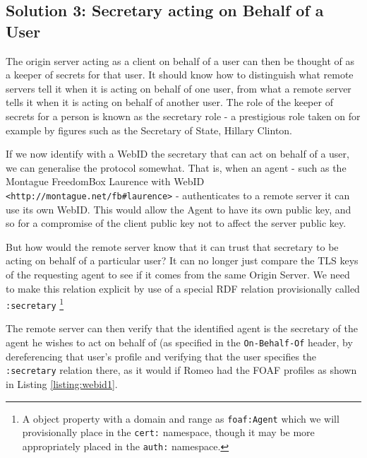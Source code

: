 \documentclass[a4paper]{llncs}
\begin{document}

\subsection{Solution 3: Secretary acting on Behalf of a User}

The origin server acting as a client on behalf of a user can then be thought of as a keeper of secrets for that user.
It should know how to distinguish what remote servers tell it when it is acting on behalf of one user, from what a remote server tells it when it is acting on behalf of another user.
The role of the keeper of secrets for a person is known as the secretary role - a prestigious role taken on for example by figures such as the Secretary of State, Hillary Clinton.

If we now identify with a WebID the secretary that can act on behalf of a user, we can generalise the protocol somewhat.
That is, when an agent - such as the Montague FreedomBox Laurence with WebID \lstinline|<http://montague.net/fb#laurence>| - authenticates to a remote server it can use its own WebID. 
This would allow the Agent to have its own public key, and so for a compromise of the client public key not to affect the server public key.

But how would the remote server know that it can trust that secretary to be acting on behalf of a particular user?
It can no longer just compare the TLS keys of the requesting agent to see if it comes from the same Origin Server.
We need to make this relation explicit by use of a special RDF relation provisionally called \lstinline|:secretary|%
\footnote{A object property with a domain and range as \lstinline|foaf:Agent| which we will provisionally place
in the \lstinline|cert:| namespace, though it may be more appropriately placed in the \lstinline|auth:| namespace.}

%

The remote server can then verify that the identified agent is the secretary of the agent he wishes to act on behalf of (as specified in the \lstinline|On-Behalf-Of| header, by dereferencing that user's profile and verifying that the user specifies the \lstinline|:secretary| relation there, as it would if Romeo had the FOAF profiles as shown in Listing \ref{listing:webid1}.
\end{document}

